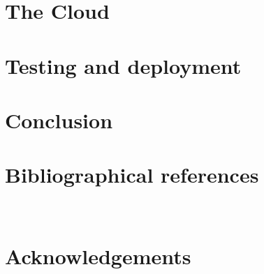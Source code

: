 \documentclass[12pt,a4paper,twoside]{book}
\begin{document}
\chapter{The Cloud}


\chapter{Testing and deployment}


\chapter{Conclusion}




\renewcommand{\bibsection}{}
\chapter*{Bibliographical references}

\newpage

\newpage~\newpage
\chapter*{Acknowledgements}

\end{document}
